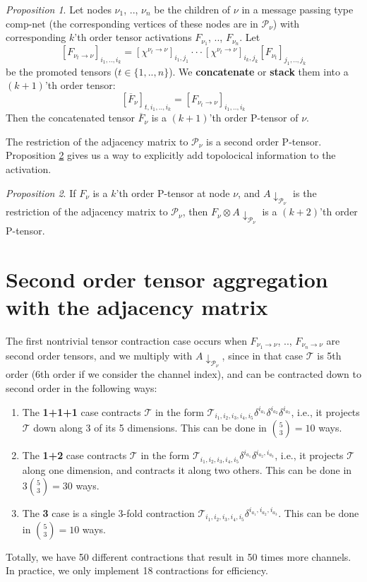 \documentclass[sigchi]{acmart}
\theoremstyle{definition}
\theoremstyle{theorem}
\theoremstyle{corollary}
\theoremstyle{lemma}
\theoremstyle{remark}
\theoremstyle{prop}
\newtheorem{prop}{Proposition}[section]
\begin{document}
\begin{prop}
Let nodes $\nu_1$, .., $\nu_n$ be the children of $\nu$ in a message passing type comp-net (the corresponding vertices of these nodes are in $\mathcal{P}_\nu$) with corresponding $k$'th order tensor activations $F_{\nu_1}$, .., $F_{\nu_n}$. Let
$$[F_{\nu_t \rightarrow \nu}]_{i_1, .., i_k} = [\chi^{\nu_t \rightarrow \nu}]_{i_1, j_1} \cdot \cdot \cdot [\chi^{\nu_t \rightarrow \nu}]_{i_k, j_k} [F_{\nu_t}]_{j_1, .., j_k}$$
be the promoted tensors ($t \in \{1, .., n\}$). We \textbf{concatenate} or \textbf{stack} them into a $(k + 1)$'th order tensor:
$$[\overline{F}_\nu]_{t, i_1, .., i_k} = [F_{\nu_t \rightarrow \nu}]_{i_1, .., i_k}$$
Then the concatenated tensor $\overline{F}_\nu$ is a $(k + 1)$'th order P-tensor of $\nu$.
\label{prop:concatenation}
\end{prop}
The restriction of the adjacency matrix to $\mathcal{P}_\nu$ is a second order P-tensor. Proposition \ref{prop:production} gives us a way to explicitly add topolocical information to the activation.
\begin{prop}
If $F_\nu$ is a $k$'th order P-tensor at node $\nu$, and $A\downarrow_{\mathcal{P}_\nu}$ is the restriction of the adjacency matrix to $\mathcal{P}_\nu$, then $F_\nu \otimes A\downarrow_{\mathcal{P}_\nu}$ is a $(k + 2)$'th order P-tensor.
\label{prop:production}
\end{prop}

\section{Second order tensor aggregation with the adjacency matrix}
\label{section:second_order_adjacency}

The first nontrivial tensor contraction case occurs when $F_{\nu_1 \rightarrow \nu}$, .., $F_{\nu_n \rightarrow \nu}$ are second order tensors, and we multiply with $A\downarrow_{\mathcal{P}_\nu}$, since in that case $\mathcal{T}$ is 5th order (6th order if we consider the channel index), and can be contracted down to second order in the following ways:
\begin{enumerate}
\item The \textbf{1+1+1} case contracts $\mathcal{T}$ in the form $\mathcal{T}_{i_1, i_2, i_3, i_4, i_5} \delta^{i_{a_1}} \delta^{i_{a_2}} \delta^{i_{a_3}}$, i.e., it projects $\mathcal{T}$ down along 3 of its 5 dimensions. This can be done in ${5 \choose 3} = 10$ ways.
\item The \textbf{1+2} case contracts $\mathcal{T}$ in the form $\mathcal{T}_{i_1, i_2, i_3, i_4, i_5} \delta^{i_{a_1}} \delta^{i_{a_2}, i_{a_3}}$, i.e., it projects $\mathcal{T}$ along one dimension, and contracts it along two others. This can be done in $3{5 \choose 3} = 30$ ways.
\item The \textbf{3} case is a single 3-fold contraction $\mathcal{T}_{i_1, i_2, i_3, i_4, i_5} \delta^{i_{a_1}, i_{a_2}, i_{a_3}}$. This can be done in ${5 \choose 3} = 10$ ways.
\end{enumerate}
Totally, we have 50 different contractions that result in 50 times more channels. In practice, we only implement 18 contractions for efficiency.
\end{document}
